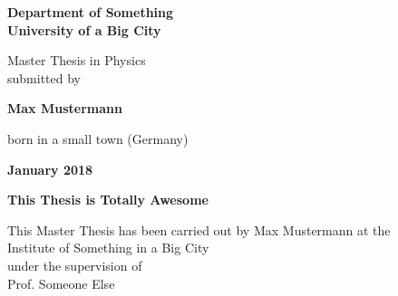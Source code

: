 \begin{titlepage}


\begin{center}
	\thispagestyle{empty}
	\Large\textbf{Department of Something\\
	University of a Big City}
	\vspace{18cm}

	\normalsize
	Master Thesis in Physics\\
	submitted by\\
	\vspace{0.5cm}

	\Large\textbf{Max Mustermann}\\
	\vspace{0.5cm}

	\normalsize
	born in a small town (Germany)\\
	\vspace{0.5cm}

	\Large\textbf{January 2018}
	\normalsize
\end{center}

\restoregeometry

\cleardoublepage

\begin{center}
	\thispagestyle{empty}
	\Large\textbf{This Thesis is Totally Awesome}
	\vspace{17cm}

	\normalsize
	This Master Thesis has been carried out by Max Mustermann at the\\
	Institute of Something in a Big City\\
	under the supervision of\\
	Prof. Someone Else
	\vfill
\end{center}

\end{titlepage}
